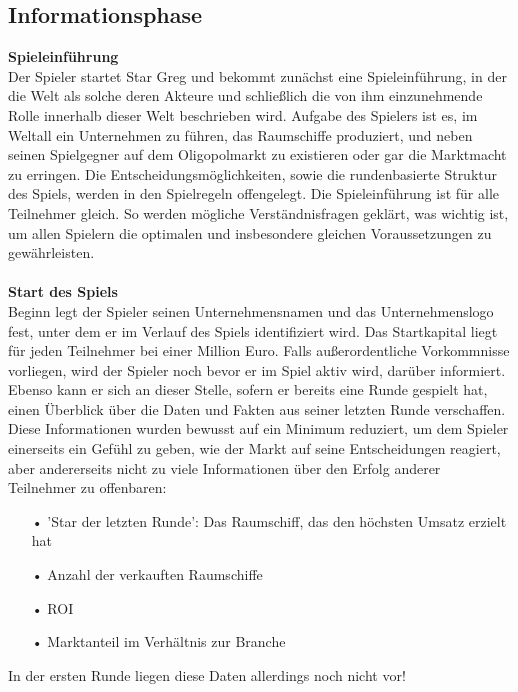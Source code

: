 \subsection{Informationsphase}
\label{sub:spielwelt-regeln-informationsphase}



\textbf{Spieleinführung}
\\
Der Spieler startet Star Greg und bekommt zunächst eine Spieleinführung, in der die Welt als solche deren Akteure und schließlich die von ihm einzunehmende Rolle innerhalb dieser Welt beschrieben wird. Aufgabe des Spielers ist es, im Weltall ein Unternehmen zu führen, das Raumschiffe produziert, und neben seinen Spielgegner auf dem Oligopolmarkt zu existieren oder gar die Marktmacht zu erringen. Die Entscheidungsmöglichkeiten, sowie die rundenbasierte Struktur des Spiels, werden in den Spielregeln offengelegt. Die Spieleinführung ist für alle Teilnehmer gleich. So werden mögliche Verständnisfragen geklärt, was wichtig ist, um allen Spielern die optimalen und insbesondere gleichen Voraussetzungen zu gewährleisten. 
\\
\\

\textbf{Start des Spiels}
\\
Beginn legt der Spieler seinen Unternehmensnamen und das Unternehmenslogo fest, unter dem er im Verlauf des Spiels identifiziert wird. Das Startkapital liegt für jeden Teilnehmer bei einer Million Euro. Falls außerordentliche Vorkommnisse vorliegen, wird der Spieler noch bevor er im Spiel aktiv wird, darüber informiert. Ebenso kann er sich an dieser Stelle, sofern er bereits eine Runde gespielt hat, einen Überblick über die Daten und Fakten aus seiner letzten Runde verschaffen. Diese Informationen wurden bewusst auf ein Minimum reduziert, um dem Spieler einerseits ein Gefühl zu geben, wie der Markt auf seine Entscheidungen reagiert, aber andererseits nicht zu viele Informationen über den Erfolg anderer Teilnehmer zu offenbaren:

\begin{itemize}
\item[•] 'Star der letzten Runde': Das Raumschiff, das den höchsten Umsatz erzielt hat
\item[•] Anzahl der verkauften Raumschiffe
\item[•] ROI
\item[•] Marktanteil im Verhältnis zur Branche
\end{itemize}

In der ersten Runde liegen diese Daten allerdings noch nicht vor! 
